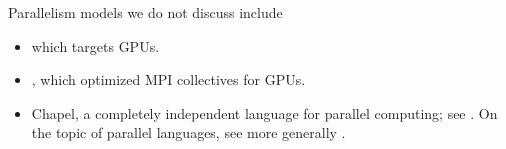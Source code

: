 Parallelism models we do not discuss include
\begin{itemize}
\item {} which targets \acp{GPU}.
\item {}, which optimized MPI collectives for \acp{GPU}.
\item Chapel, a completely independent language for parallel computing;
  see .
  On the topic of parallel languages, see more generally .
\end{itemize}
